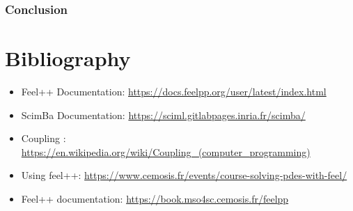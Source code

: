 \documentclass[12pt]{article}
\begin{document}
\newpage

\section{Conclusion}


\newpage

\part*{Bibliography}




\begin{itemize}
    \item Feel++ Documentation: \url{https://docs.feelpp.org/user/latest/index.html}
    \item ScimBa Documentation: \url{https://sciml.gitlabpages.inria.fr/scimba/}
    \item Coupling : \url{https://en.wikipedia.org/wiki/Coupling_(computer_programming)}
    \item Using feel++:
    \url{https://www.cemosis.fr/events/course-solving-pdes-with-feel/}
    \item Feel++ documentation:
    \url{https://book.mso4sc.cemosis.fr/feelpp}

\end{itemize}
\end{document}
